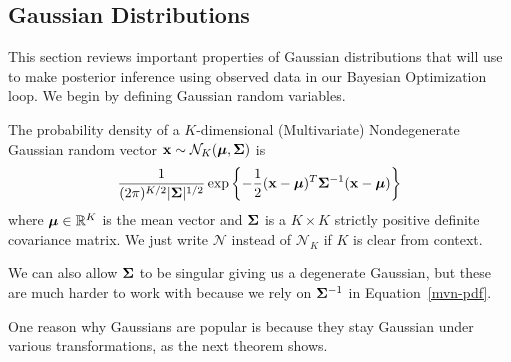 \subsection{Gaussian Distributions}

This section reviews important properties of Gaussian distributions that will use to make posterior inference using observed data in our Bayesian Optimization loop.
We begin by defining Gaussian random variables.

\begin{definition}
    The probability density of a $K$-dimensional (Multivariate) Nondegenerate Gaussian random vector $\mathbf{x} \sim \mathcal{N}_K(\boldsymbol{\mu}, \boldsymbol{\Sigma})$
    is
    \begin{equation}
        \label{mvn-pdf}
        \frac{ 1 }{ (2 \pi)^{K/2} \lvert \boldsymbol{\Sigma} \rvert^{1/2} } \exp \left\{ -\frac12 (\mathbf{x} - \boldsymbol{\mu})^{T} \boldsymbol{\Sigma}^{-1} (\mathbf{x} - \boldsymbol{\mu})  \right\}
    \end{equation}
    where $\boldsymbol{\mu} \in \mathbb{R}^{K}$ is the mean vector and $\boldsymbol{\Sigma}$ is a $K \times K$ strictly positive definite covariance matrix.
    We just write $\mathcal{N}$ instead of $\mathcal{N}_K$ if $K$ is clear from context.
\end{definition}

We can also allow $\boldsymbol{\Sigma}$ to be singular giving us a degenerate Gaussian, but these are much harder to work with because we rely on $\boldsymbol{\Sigma}^{-1}$ in Equation~\ref{mvn-pdf}.

One reason why Gaussians are popular is because they stay Gaussian under various transformations, as the next theorem shows.

